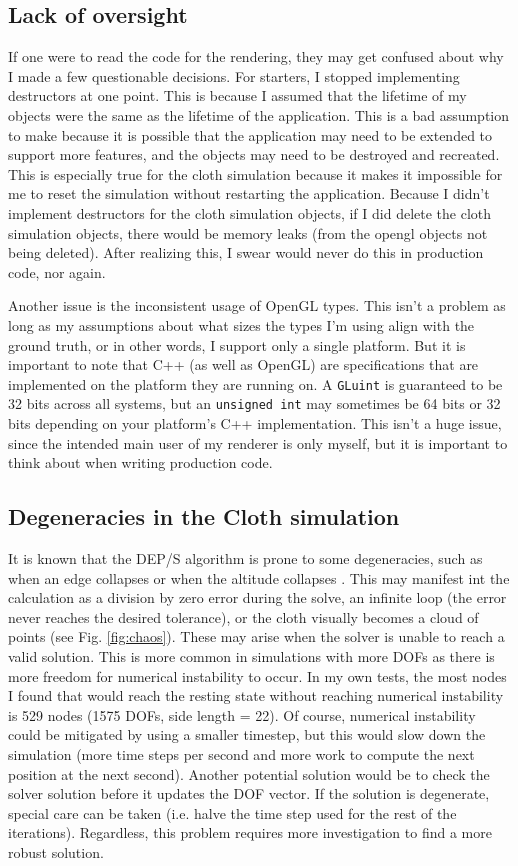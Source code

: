 \documentclass[letterpaper, 10 pt, conference]{ieeeconf}  %
\begin{document}
\subsection{Lack of oversight}
If one were to read the code for the rendering, they may get confused about why I made a few questionable decisions. For starters, I stopped implementing destructors at one point. This is because I assumed that the lifetime of my objects were the same as the lifetime of the application. This is a bad assumption to make because it is possible that the application may need to be extended to support more features, and the objects may need to be destroyed and recreated. This is especially true for the cloth simulation because it makes it impossible for me to reset the simulation without restarting the application. Because I didn't implement destructors for the cloth simulation objects, if I did delete the cloth simulation objects, there would be memory leaks (from the opengl objects not being deleted). After realizing this, I swear would never do this in production code, nor again. 

Another issue is the inconsistent usage of OpenGL types. This isn't a problem as long as my assumptions about what sizes the types I'm using align with the ground truth, or in other words, I support only a single platform. But it is important to note that C++ (as well as OpenGL) are specifications that are implemented on the platform they are running on. A \texttt{GLuint} is guaranteed to be 32 bits across all systems, but an \texttt{unsigned int} may sometimes be 64 bits or 32 bits depending on your platform's C++ implementation. This isn't a huge issue, since the intended main user of my renderer is only myself, but it is important to think about when writing production code.

\subsection{Degeneracies in the Cloth simulation}
It is known that the DEP/S algorithm is prone to some degeneracies, such as when an edge collapses or when the altitude collapses \cite{Tamstorf2013discrete}. This may manifest int the calculation as a division by zero error during the solve, an infinite loop (the error never reaches the desired tolerance), or the cloth visually becomes a cloud of points (see Fig. \ref{fig:chaos}). These may arise when the solver is unable to reach a valid solution. This is more common in simulations with more DOFs as there is more freedom for numerical instability to occur. In my own tests, the most nodes I found that would reach the resting state without reaching numerical instability is 529 nodes (1575 DOFs, side length = 22). Of course, numerical instability could be mitigated by using a smaller timestep, but this would slow down the simulation (more time steps per second and more work to compute the next position at the next second). Another potential solution would be to check the solver solution before it updates the DOF vector. If the solution is degenerate, special care can be taken (i.e. halve the time step used for the rest of the iterations). Regardless, this problem requires more investigation to find a more robust solution.
\end{document}
